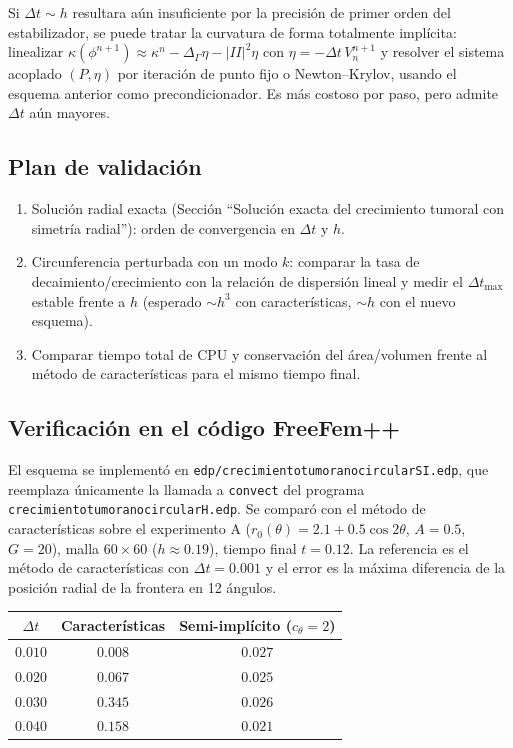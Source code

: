 Si $\Delta t\sim h$ resultara aún insuficiente por la precisión de primer orden del estabilizador, se puede tratar la curvatura de forma totalmente implícita: linealizar $\kappa(\phi^{n+1})\approx\kappa^n-\Delta_\Gamma\eta-|II|^2\eta$ con $\eta=-\Delta t\,V_n^{n+1}$ y resolver el sistema acoplado $(P,\eta)$ por iteración de punto fijo o Newton--Krylov, usando el esquema anterior como precondicionador. Es más costoso por paso, pero admite $\Delta t$ aún mayores.

\subsection{Plan de validación}
\begin{enumerate}
	\item Solución radial exacta (Sección ``Solución exacta del crecimiento tumoral con simetría radial''): orden de convergencia en $\Delta t$ y $h$.
	\item Circunferencia perturbada con un modo $k$: comparar la tasa de decaimiento/crecimiento con la relación de dispersión lineal y medir el $\Delta t_{\max}$ estable frente a $h$ (esperado $\sim h^3$ con características, $\sim h$ con el nuevo esquema).
	\item Comparar tiempo total de CPU y conservación del área/volumen frente al método de características para el mismo tiempo final.
\end{enumerate}

\subsection{Verificación en el código FreeFem++}

El esquema se implementó en \texttt{edp/crecimientotumoranocircularSI.edp}, que reemplaza únicamente la llamada a \texttt{convect} del programa \texttt{crecimientotumoranocircularH.edp}. Se comparó con el método de características sobre el experimento A ($r_0(\theta)=2.1+0.5\cos 2\theta$, $A=0.5$, $G=20$), malla $60\times60$ ($h\approx0.19$), tiempo final $t=0.12$. La referencia es el método de características con $\Delta t=0.001$ y el error es la máxima diferencia de la posición radial de la frontera en 12 ángulos.

\begin{center}
\begin{tabular}{ccc}
\toprule
$\Delta t$ & Características & Semi-implícito ($c_\theta=2$)\\
\midrule
$0.010$ & $0.008$ & $0.027$\\
$0.020$ & $0.067$ & $0.025$\\
$0.030$ & $0.345$ & $0.026$\\
$0.040$ & $0.158$ & $0.021$\\
\bottomrule
\end{tabular}
\end{center}

